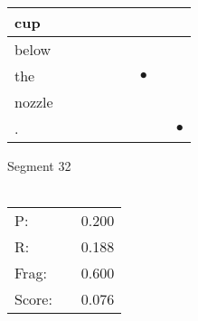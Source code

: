 \documentclass[landscape]{article}
\newcommand{\ssp}{\hspace{2pt}}
\newcommand{\mex}{\cellcolor{g}$\bullet$}
\begin{document}
\begin{tabular}{|l|p{10pt}|p{10pt}|p{10pt}|p{10pt}|p{10pt}|p{10pt}|p{10pt}|p{10pt}|}
\hline
\ssp cup \ssp&\hspace{2pt}&\hspace{2pt}&\hspace{2pt}&\hspace{2pt}&\hspace{2pt}&\hspace{2pt}&\hspace{2pt}&\hspace{2pt}\\
\hline
\ssp below \ssp&\hspace{2pt}&\hspace{2pt}&\hspace{2pt}&\hspace{2pt}&\hspace{2pt}&\hspace{2pt}&\hspace{2pt}&\hspace{2pt}\\
\hline
\ssp \cellcolor{ref5}the \ssp&\hspace{2pt}&\hspace{2pt}&\hspace{2pt}&\hspace{2pt}&\hspace{2pt}&\hspace{2pt}\mex&\hspace{2pt}&\hspace{2pt}\\
\hline
\ssp nozzle \ssp&\hspace{2pt}&\hspace{2pt}&\hspace{2pt}&\hspace{2pt}&\hspace{2pt}&\hspace{2pt}&\hspace{2pt}&\hspace{2pt}\\
\hline
\ssp \cellcolor{ref7}. \ssp&\hspace{2pt}&\hspace{2pt}&\hspace{2pt}&\hspace{2pt}&\hspace{2pt}&\hspace{2pt}&\hspace{2pt}&\hspace{2pt}\mex\\
\hline
\end{tabular}

\vspace{6pt}
\noindent Segment 32\\\\
\noindent\begin{tabular}{lm{12pt}r}
\hline
P:&&0.200\\
R:&&0.188\\
Frag:&&0.600\\
Score:&&0.076\\
\end{tabular}
\end{document}
